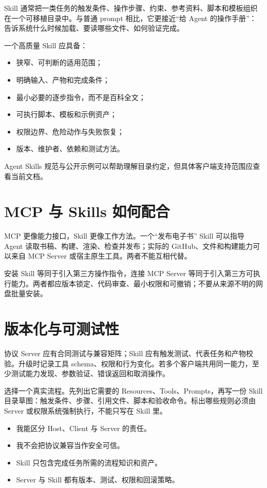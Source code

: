 Skill 通常把一类任务的触发条件、操作步骤、约束、参考资料、脚本和模板组织在一个可移植目录中。与普通 prompt 相比，它更接近“给 Agent 的操作手册”：告诉系统什么时候加载、要读哪些文件、如何验证完成。

一个高质量 Skill 应具备：

\begin{itemize}
  \item 狭窄、可判断的适用范围；
  \item 明确输入、产物和完成条件；
  \item 最小必要的逐步指令，而不是百科全文；
  \item 可执行脚本、模板和示例资产；
  \item 权限边界、危险动作与失败恢复；
  \item 版本、维护者、依赖和测试方法。
\end{itemize}

Agent Skills 规范与公开示例可以帮助理解目录约定，但具体客户端支持范围应查看当前文档\citep{agent_skills_spec}。

\section{MCP 与 Skills 如何配合}

MCP 更像能力接口，Skill 更像工作方法。一个“发布电子书” Skill 可以指导 Agent 读取书稿、构建、渲染、检查并发布；实际的 GitHub、文件和构建能力可以来自 MCP Server 或宿主原生工具。两者不能互相代替。

\begin{warningbox}
安装 Skill 等同于引入第三方操作指令，连接 MCP Server 等同于引入第三方可执行能力。两者都应版本锁定、代码审查、最小权限和可撤销；不要从来源不明的网盘批量安装。
\end{warningbox}

\section{版本化与可测试性}

协议 Server 应有合同测试与兼容矩阵；Skill 应有触发测试、代表任务和产物校验。升级时记录工具 schema、权限和行为变化。若多个客户端共用同一能力，至少测试能力发现、参数验证、错误返回和取消操作。

\begin{practice}
选择一个真实流程。先列出它需要的 Resources、Tools、Prompts，再写一份 Skill 目录草图：触发条件、步骤、引用文件、脚本和验收命令。标出哪些规则必须由 Server 或权限系统强制执行，不能只写在 Skill 里。
\end{practice}

\begin{checkpoint}
\begin{itemize}
  \item \checkbox 我能区分 Host、Client 与 Server 的责任。
  \item \checkbox 我不会把协议兼容当作安全可信。
  \item \checkbox Skill 只包含完成任务所需的流程知识和资产。
  \item \checkbox Server 与 Skill 都有版本、测试、权限和回滚策略。
\end{itemize}
\end{checkpoint}
